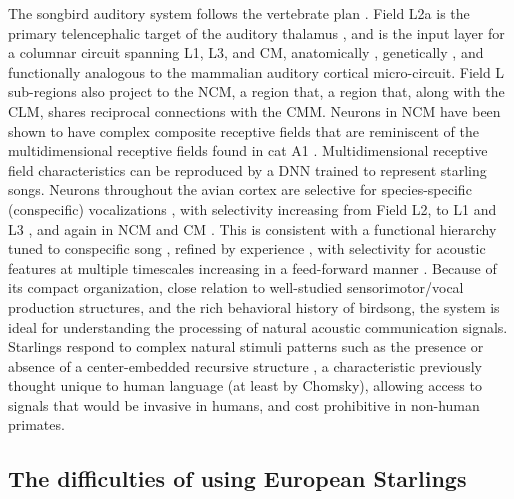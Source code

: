 The songbird auditory system follows the vertebrate plan \cite{Carr1992}. Field L2a is the primary telencephalic target of the auditory thalamus \cite{Karten1968}, and is the input layer for a columnar circuit spanning L1, L3, and \ac{CM}, anatomically \cite{Wang2010a,Jarvis2005}, genetically \cite{Dugas-Ford2012}, and functionally \cite{Calabrese2015} analogous to the mammalian auditory cortical micro-circuit. Field L sub-regions also project to the \ac{NCM}, a region that, a region that, along with the \ac{CLM}, shares reciprocal connections with the \ac{CMM}. Neurons in \ac{NCM} have been shown to have complex composite receptive fields \cite{kozlov2016central} that are reminiscent of the multidimensional receptive fields found in cat A1 \cite{atencio2008cooperative}. Multidimensional receptive field characteristics can be reproduced by a \ac{DNN} \cite{kozlov2016central} trained to represent starling songs. Neurons throughout the avian cortex are selective for species-specific (conspecific) vocalizations \cite{Bonke1979,Leppelsack1976,Muller1985}, with selectivity increasing from Field L2, to L1 and L3 \cite{Theunissen2004,Theunissen1998,Theunissen2000}, and again in \ac{NCM} and \ac{CM} \cite{Calabrese2015,Muller1985,Grace2003,Bonke1979,Leppelsack1976,gentner2003neuronal,Gentner2004,Thompson2010,Jeanne2011}. This is consistent with a functional hierarchy tuned to conspecific song \cite{Hsu2004,Woolley2005}, refined by experience \cite{gentner2003neuronal,Sockman2002,Sockman2005,Phan2006,Thompson2010,Jeanne2011}, with selectivity for acoustic features at multiple timescales increasing in a feed-forward manner \cite{Rose1988,Kaas2000,Binder2000,VanEssen1992}. Because of its compact organization, close relation to well-studied sensorimotor/vocal production structures, and the rich behavioral history of birdsong, the system is ideal for understanding the processing of natural acoustic communication signals.
Starlings respond to complex natural stimuli patterns such as the presence or absence of a center-embedded recursive structure \cite{gentner2006recursive,comins2014auditory,comins2014temporal}, a characteristic previously thought unique to human language (at least by Chomsky), allowing access to signals that would be invasive in humans, and cost prohibitive in non-human primates.

\subsection{The difficulties of using European Starlings}

